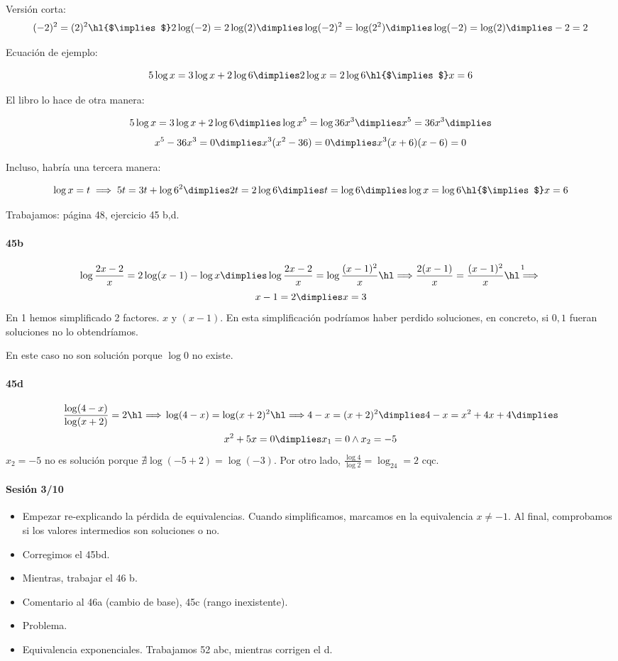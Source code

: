 Versión corta:
\[
	(-2)^2 = (2)^2 \text{\hl{$\implies$}} 2\log(-2) = 2\log(2) \dimplies \log(-2)^2 = \log(2^2) \dimplies \log(-2) = \log(2) \dimplies -2=2
\]

Ecuación de ejemplo:

\[
	5\log x=3\log x+2\log 6 \dimplies 2\log x=2\log6 \text{\hl{$\implies$}} x=6
\]


El libro lo hace de otra manera:

\[
	5\log x=3\log x+2\log 6 \dimplies \log x^5=\log36x^3 \dimplies x^5=36x^3 \dimplies
\]
\[
	x^5-36x^3 = 0 \dimplies x^3(x^2-36) = 0 \dimplies x^3(x+6)(x-6) = 0
\]

Incluso, habría una tercera manera:

\[
	\log x=t \implies 5t=3t+\log6^2 \dimplies 2t=2\log6 \dimplies t=\log6 \dimplies \log x=\log6 \text{\hl{$\implies$}} x=6
\]

Trabajamos: página 48, ejercicio 45 b,d.

\paragraph{45b}
\[
	\log\frac{2x-2}{x} = 2\log(x-1)-\log x \dimplies \log \frac{2x-2}{x}=\log\frac{(x-1)^2}{x} \cimplies \frac{2(x-1)}{x} = \frac{(x-1)^2}{x} \overset{1}{\cimplies}
	\]
	\[ 
	x-1=2 \dimplies x=3
\]
En 1 hemos simplificado 2 factores. $x$ y $(x-1)$. En esta simplificación podríamos haber perdido soluciones, en concreto, si $0,1$ fueran soluciones no lo obtendríamos. 

En este caso no son solución porque $\log 0$ no existe.

\paragraph{45d}
\[
\frac{\log (4-x)}{\log(x+2)}=2 \cimplies \log(4-x) = \log(x+2)^2 \cimplies 4-x=(x+2)^2 \dimplies 4-x=x^2+4x+4 \dimplies
	\]
	\[ x^2+5x=0 \dimplies x_1=0 \wedge x_2=-5
\]
$x_2=-5$ no es solución porque $\nexists\log(-5+2)=\log(-3)$. Por otro lado, $\frac{\log4}{\log2} = \log_24=2$ cqc.

\paragraph{Sesión 3/10}
\begin{itemize}
	\item Empezar re-explicando la pérdida de equivalencias. Cuando simplificamos, marcamos en la equivalencia $x\neq-1$. Al final, comprobamos si los valores intermedios son soluciones o no.
	\item Corregimos el 45bd.
	\item Mientras, trabajar el 46 b.
	\item Comentario al 46a (cambio de base), 45c (rango inexistente).
	\item Problema.
	\item Equivalencia exponenciales. Trabajamos 52 abc, mientras corrigen el d.
\end{itemize}

